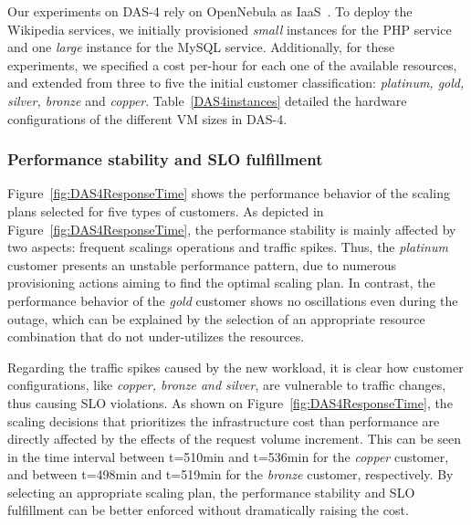 Our experiments on DAS-4 rely on OpenNebula as IaaS~\cite{sotomayor_virtual_2009}. To deploy the Wikipedia services, we initially provisioned \emph{small} instances for the PHP service and one \emph{large} instance for the MySQL service. Additionally, for these experiments, we specified a cost per-hour for each one of the available resources, and extended from three to five the initial customer classification: \emph{platinum, gold, silver, bronze} and \emph{copper}. Table~\ref{DAS4instances} detailed the hardware configurations of the different VM sizes in DAS-4.




\subsubsection{Performance stability and SLO fulfillment}

Figure~\ref{fig:DAS4ResponseTime} shows the performance behavior of the scaling plans selected for five types of customers. As depicted in Figure~\ref{fig:DAS4ResponseTime}, the performance stability is mainly affected by two aspects: frequent scalings operations and traffic spikes. Thus, the \emph{platinum} customer presents an unstable performance pattern, due to numerous provisioning actions aiming to find the optimal scaling plan. In contrast, the performance behavior of the \emph{gold} customer shows no oscillations even during the outage, which can be explained by the selection of an appropriate resource combination that do not under-utilizes the resources.



Regarding the traffic spikes caused by the new workload, it is clear how customer configurations, like \emph{copper, bronze and silver}, are vulnerable to traffic changes, thus causing SLO violations. As shown on Figure~\ref{fig:DAS4ResponseTime},  the scaling decisions that prioritizes the infrastructure cost than performance are directly affected by the effects of the request volume increment. This can be seen in the time interval between t=510min and t=536min for the \emph{copper} customer, and between t=498min and t=519min for the \emph{bronze} customer, respectively. By selecting an appropriate scaling plan, the performance stability and SLO fulfillment can be better enforced without dramatically raising the cost.

